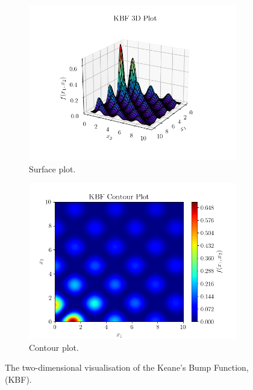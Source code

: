 \documentclass[10pt]{article}
\begin{document}
\begin{figure}[H]
\centering
\begin{subfigure}{0.49\textwidth}
    \centering
    \includegraphics[width=\textwidth]{../figures/KBF/KBF_surf.png}
    \caption{Surface plot.}
    \label{fig:KBF_surf}
\end{subfigure}
\begin{subfigure}{0.49\textwidth}
    \centering
    \includegraphics[width=\textwidth]{../figures/KBF/KBF_contour.png}
    \caption{Contour plot.}
    \label{fig:KBF_contour}
\end{subfigure}
    \captionsetup{justification=centering}
    \caption{The two-dimensional visualisation of the Keane's Bump Function, (KBF).}
    \label{fig:KBF_2D}
\end{figure}
\end{document}
